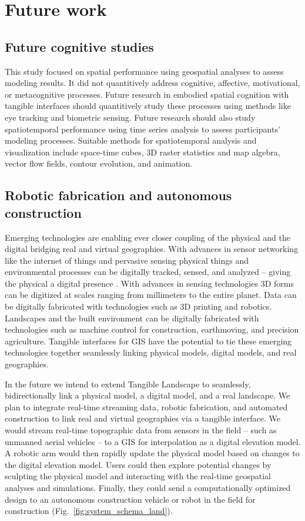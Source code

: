 \documentclass[prodmode,acmtochi]{acmsmall} %
\begin{document}
\section{Future work}
%
\subsection{Future cognitive studies}
%
This study focused on spatial performance
using geospatial analyses to assess modeling results. 
%
It did not quantitively address 
cognitive, affective, motivational, or metacognitive processes. 
%
Future research in embodied spatial cognition with tangible interfaces 
should quantitively study these processes using methods like 
eye tracking and biometric sensing.  
%
Future research should also study spatiotemporal performance
using time series analysis to assess participants' modeling processes.
%
Suitable methods for spatiotemporal analysis and visualization include 
space-time cubes, 3D raster statistics and map algebra, 
vector flow fields, contour evolution, and animation.

\subsection{Robotic fabrication and autonomous construction}
%
Emerging technologies are enabling ever closer coupling 
of the physical and the digital 
bridging real and virtual geographies. 
%
With advances in sensor networking like 
the internet of things and pervasive sensing 
physical things and environmental processes
can be digitally tracked, sensed, and analyzed  
-- giving the physical a digital presence \cite{Ratti2009,Resch2011}. 
%
With advances in sensing technologies
3D forms can be digitized at scales ranging from millimeters to the entire planet.
%
Data can be digitally fabricated with technologies such as 3D printing and robotics. 
%
Landscapes and the built environment can be digitally fabricated 
with technologies such as machine control 
for construction, earthmoving, and precision agriculture.
%
Tangible interfaces for GIS have the potential to 
tie these emerging technologies together 
seamlessly linking physical models, digital models, and real geographies. 

In the future we intend to extend Tangible Landscape to 
seamlessly, bidirectionally link 
a physical model, a digital model, and a real landscape.
%
We plan to integrate real-time streaming data, 
robotic fabrication, 
and automated construction 
to link real and virtual geographies via a tangible interface. 
%
We would stream real-time topographic data 
from sensors in the field -- such as unmanned aerial vehicles --
to a GIS for interpolation as a digital elevation model. 
%
A robotic arm would then rapidly update the physical model 
based on changes to the digital elevation model. 
%
Users could then explore potential changes by sculpting the physical model
and interacting with the real-time geospatial analyses and simulations. 
Finally, they could send a computationally optimized design 
to an autonomous construction vehicle or robot in the field for construction 
(Fig.~\ref{fig:system_schema_land}). 
\end{document}
